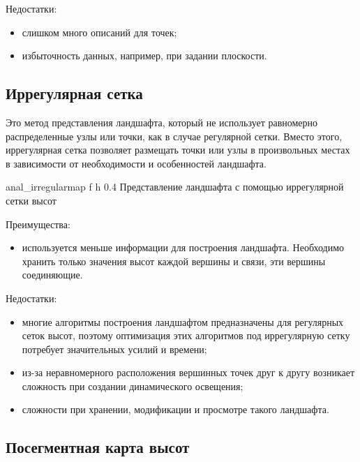 Недостатки:

\begin{itemize}[label=--]
	\item слишком много описаний для точек;
	\item избыточность данных, например, при задании плоскости.
\end{itemize}

\subsection{Иррегулярная сетка}

Это метод представления ландшафта, который не использует равномерно распределенные узлы или точки, как в случае регулярной сетки. Вместо этого, иррегулярная сетка позволяет размещать точки или узлы в произвольных местах в зависимости от необходимости и особенностей ландшафта.

\clearpage

{anal_irregularmap} %
{f} %
{h} %
{0.4\textwidth} %
{Представление ландшафта с помощью иррегулярной сетки высот} %

Преимущества:

\begin{itemize}[label=--]
	\item используется меньше информации для построения ландшафта. Необходимо хранить только значения высот каждой вершины и связи, эти вершины соединяющие.
\end{itemize}

Недостатки:

\begin{itemize}[label=--]
	\item многие алгоритмы построения ландшафтом предназначены для регулярных сеток высот, поэтому оптимизация этих алгоритмов под иррегулярную сетку потребует значительных усилий и времени;
	\item из-за неравномерного расположения вершинных точек друг к другу возникает сложность при создании динамического освещения;
	\item сложности при хранении, модификации и просмотре такого ландшафта.
\end{itemize}

\subsection{Посегментная карта высот}


